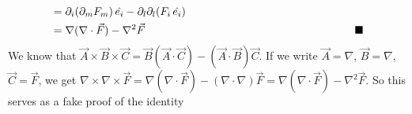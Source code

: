 \documentclass[../main.tex]{subfiles}
\begin{document}
\begin{questions}
\begin{solution}
\begin{align}
		&= \partial_i(\partial_mF_m)\,\hat{e_i} - \partial_l\partial_l(F_i\,\hat{e_i}) \\
		&= \nabla(\nabla\cdot\vec{F})-\nabla^2\vec{F} \hskip0.55\textwidth\blacksquare
	\end{align}
	We know that $\vec{A}\times\vec{B}\times\vec{C} = \vec{B}(\vec{A}\cdot\vec{C}) - (\vec{A}\cdot\vec{B})\vec{C}$. If we write $\vec{A}=\nabla$, $\vec{B}=\nabla$, $\vec{C}=\vec{F}$, we get $\nabla\times\nabla\times\vec{F} = \nabla(\nabla\cdot\vec{F}) - (\nabla\cdot\nabla)\vec{F} = \nabla(\nabla\cdot\vec{F})-\nabla^2\vec{F}$. So this serves as a fake proof of the identity
\end{solution}

\end{questions}
\end{document}
